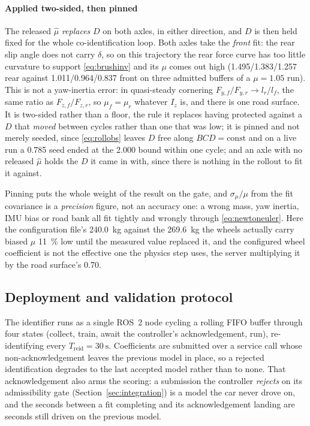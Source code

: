 \paragraph{Applied two-sided, then pinned}
\label{subsec:frictionfloor}
The released $\hat\mu$ \emph{replaces} $D$ on both axles, in either direction,
and $D$ is then held fixed for the whole co-identification loop. Both axles take
the \emph{front} fit: the rear slip angle does not carry $\delta$, so on this
trajectory the rear force curve has too little curvature to support
\eqref{eq:brushinv} and its $\mu$ comes out high
(\num{1.495}/\num{1.383}/\num{1.257} rear against
\num{1.011}/\num{0.964}/\num{0.837} front on three admitted buffers of a
$\mu=\num{1.05}$ run). This is not a yaw-inertia error: in quasi-steady
cornering $F_{y,f}/F_{y,r}\to l_{r}/l_{f}$, the same ratio as
$F_{z,f}/F_{z,r}$, so $\mu_{f}=\mu_{r}$ whatever $I_{z}$ is, and there is one
road surface. It is two-sided rather than a floor, the rule it replaces having
protected against a $D$ that \emph{moved} between cycles rather than one that
was low; it is pinned and not merely seeded, since \eqref{eq:rollobs} leaves $D$
free along $BCD=\mathrm{const}$ and on a live run a \num{0.785} seed ended at
the \num{2.000} bound within one cycle; and an axle with no released $\hat\mu$
holds the $D$ it came in with, since there is nothing in the rollout to fit it
against.

Pinning puts the whole weight of the result on the gate, and $\sigma_{\mu}/\mu$
from the fit covariance is a \emph{precision} figure, not an accuracy one: a
wrong mass, yaw inertia, IMU bias or road bank all fit tightly and wrongly
through \eqref{eq:newtoneuler}. Here the configuration file's
\SI{240.0}{\kilo\gram} against the \SI{269.6}{\kilo\gram} the wheels actually
carry biased $\mu$ \SI{11}{\percent} low until the measured value replaced it,
and the configured wheel coefficient is not the effective one the physics step
uses, the server multiplying it by the road surface's \num{0.70}.

\subsection{Deployment and validation protocol}
\label{subsec:deployment}

The identifier runs as a single ROS~2 node cycling a rolling FIFO buffer through
four states (collect, train, await the controller's acknowledgement, run),
re-identifying every $T_{\mathrm{reid}}=\SI{30}{\second}$. Coefficients are
submitted over a service call whose non-acknowledgement leaves the previous
model in place, so a rejected identification degrades to the last accepted model
rather than to none. That acknowledgement also arms the scoring: a submission
the controller \emph{rejects} on its admissibility gate
(Section~\ref{sec:integration}) is a model the car never drove on, and the
seconds between a fit completing and its acknowledgement landing are seconds
still driven on the previous model.

